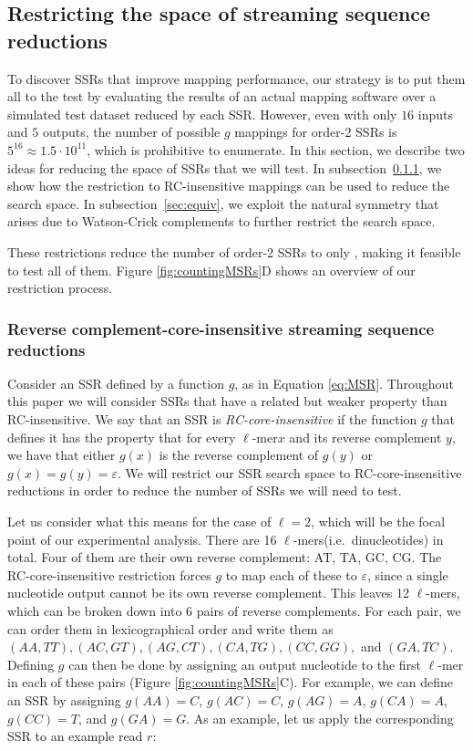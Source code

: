 \documentclass[
  11pt,
  twoside]{scrbook}
\begin{document}
\hypertarget{sec:enum}{%
\subsection{Restricting the space of streaming sequence reductions}\label{sec:enum}}

To discover SSRs that improve mapping performance, our strategy is to put them all to the test by evaluating the results of an actual mapping software over a simulated test dataset reduced by each SSR. However, even with only \(16\) inputs and \(5\) outputs, the number of possible \(g\) mappings for order-2 SSRs is \(5^{16}\approx 1.5\cdot10^{11}\), which is prohibitive to enumerate. In this section, we describe two ideas for reducing the space of SSRs that we will test. In subsection~\ref{sec:rc-insensitive}, we show how the restriction to RC-insensitive mappings can be used to reduce the search space. In subsection~\ref{sec:equiv}, we exploit the natural symmetry that arises due to Watson-Crick complements to further restrict the search space.

These restrictions reduce the number of order-2 SSRs to only , making it feasible to test all of them. Figure \ref{fig:countingMSRs}D shows an overview of our restriction process.

\hypertarget{sec:rc-insensitive}{%
\subsubsection{Reverse complement-core-insensitive streaming sequence reductions}\label{sec:rc-insensitive}}

Consider an SSR defined by a function \(g\), as in Equation \eqref{eq:MSR}. Throughout this paper we will consider SSRs that have a related but weaker property than RC-insensitive. We say that an SSR is \emph{RC-core-insensitive} if the function \(g\) that defines it has the property that for every \(\ell\)-mer\(x\) and its reverse complement \(y\), we have that either \(g(x)\) is the reverse complement of \(g(y)\) or \(g(x) = g(y) = \varepsilon\). We will restrict our SSR search space to RC-core-insensitive reductions in order to reduce the number of SSRs we will need to test.

Let us consider what this means for the case of \(\ell=2\), which will be the focal point of our experimental analysis. There are 16 \(\ell\)-mers(i.e.~dinucleotides) in total. Four of them are their own reverse complement: AT, TA, GC, CG. The RC-core-insensitive restriction forces \(g\) to map each of these to \(\varepsilon\), since a single nucleotide output cannot be its own reverse complement. This leaves 12 \(\ell\)-mers, which can be broken down into 6 pairs of reverse complements. For each pair, we can order them in lexicographical order and write them as \((AA,TT), (AC,GT), (AG,CT), (CA,TG), (CC,GG),\) and \((GA,TC)\). Defining \(g\) can then be done by assigning an output nucleotide to the first \(\ell\)-mer in each of these pairs (Figure \ref{fig:countingMSRs}C). For example, we can define an SSR by assigning \(g(AA) = C\), \(g(AC) = C\), \(g(AG) = A\), \(g(CA) = A\), \(g(CC) = T\), and \(g(GA) = G\). As an example, let us apply the corresponding SSR to an example read \(r\):
\end{document}
